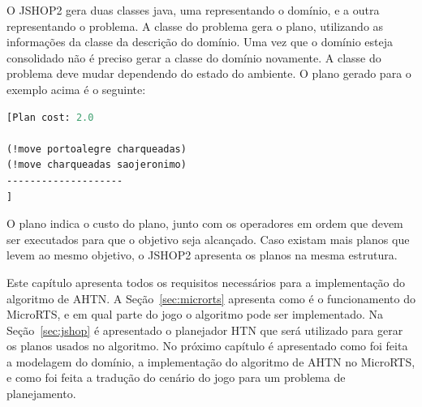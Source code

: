 O JSHOP2 gera duas classes java, uma representando o domínio, e a outra representando o problema.
A classe do problema gera o plano, utilizando as informações da classe da descrição do domínio.
Uma vez que o domínio esteja consolidado não é preciso gerar a classe do domínio novamente. A classe do problema deve mudar dependendo do estado do ambiente.  
O plano gerado para o exemplo acima é o seguinte:

\begin{lstlisting}[language=lisp]
[Plan cost: 2.0

(!move portoalegre charqueadas)
(!move charqueadas saojeronimo)
--------------------
]
\end{lstlisting}

O plano indica o custo do plano, junto com os operadores em ordem que devem ser executados para que o objetivo seja alcançado. 
Caso existam mais planos que levem ao mesmo objetivo, o JSHOP2 apresenta os planos na mesma estrutura.

Este capítulo apresenta todos os requisitos necessários para a implementação do algoritmo de AHTN.
A Seção~\ref{sec:microrts} apresenta como é o funcionamento do MicroRTS, e em qual parte do jogo o algoritmo pode ser implementado.
Na Seção~\ref{sec:jshop} é apresentado o planejador HTN que será utilizado para gerar os planos usados no algoritmo. 
No próximo capítulo é apresentado como foi feita a modelagem do domínio, a implementação do algoritmo de AHTN no MicroRTS, e como foi feita a tradução do cenário do jogo para um problema de planejamento.

